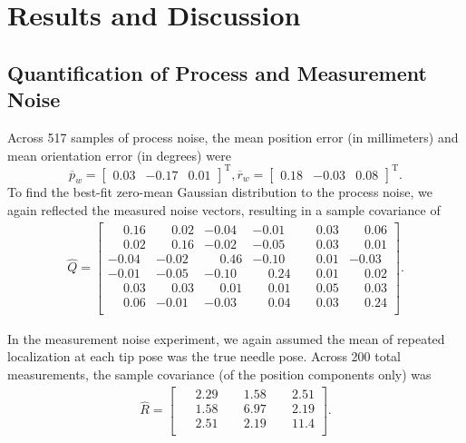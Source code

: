 \section{Results and Discussion}
\label{sec:HumanInTheLoopResults}
\subsection{Quantification of Process and Measurement Noise}
Across 517 samples of process noise, the mean position error (in millimeters) and mean orientation error (in degrees) were \[{\overline{p}_{w}} = \begin{bmatrix} 0.03 &-0.17 &0.01 \end{bmatrix}^{\text{T}}, {\overline{r}_{w}} = \begin{bmatrix} 0.18 &-0.03 &0.08 \end{bmatrix}^{\text{T}}.\] To find the best-fit zero-mean Gaussian distribution to the process noise, we again reflected the measured noise vectors, resulting in a sample covariance of
\begin{align*}
{\hat{Q}} = \begin{bmatrix} 
\phantom{-}0.16 & \phantom{-}0.02 	&-0.04 & -0.01 & \phantom{-}0.03 & \phantom{-}0.06\\
\phantom{-}0.02 & \phantom{-}0.16 & -0.02 & -0.05 & \phantom{-}0.03 & \phantom{-}0.01 \\ 
-0.04 & -0.02 & \phantom{-}0.46 & -0.10 & \phantom{-}0.01 & -0.03 \\
-0.01 & -0.05 & -0.10 & \phantom{-}0.24 & \phantom{-}0.01 & \phantom{-}0.02 \\
\phantom{-}0.03 & \phantom{-}0.03 & \phantom{-}0.01 & \phantom{-}0.01 & \phantom{-}0.05 & \phantom{-}0.03 \\
\phantom{-}0.06 & -0.01 & -0.03 & \phantom{-}0.04 & \phantom{-}0.03 & \phantom{-}0.24\\ 
\end{bmatrix}.
\end{align*}

In the measurement noise experiment, we again assumed the mean of repeated localization at each tip pose was the true needle pose. Across 200 total measurements, the sample covariance (of the position components only) was 
\begin{align*}
{\hat{R}} = \begin{bmatrix} 
\phantom{-}2.29 & \phantom{-}1.58 & \phantom{-}2.51 \\ 
\phantom{-}1.58 & \phantom{-}6.97 & \phantom{-}2.19 \\ 
\phantom{-}2.51 & \phantom{-}2.19 & \phantom{-}11.4 \\ 
\end{bmatrix}.
\end{align*}

